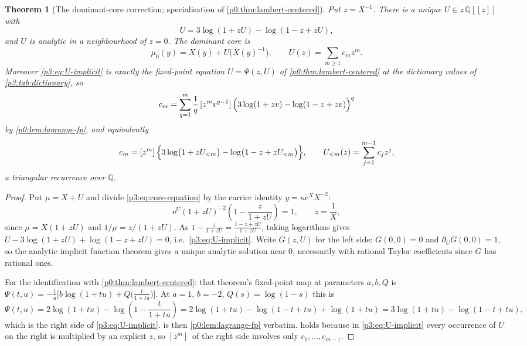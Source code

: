 \documentclass[11pt,a4paper,oneside]{book}
\theoremstyle{plain}
\newtheorem{theorem}{Theorem}[chapter]
\theoremstyle{definition}
\theoremstyle{remark}
\newcommand{\Rat}{\mathbb{Q}}
\newcommand{\e}{\mathrm{e}}
\newcommand{\Coef}[1]{[#1]\,}
\begin{document}
\begin{theorem}[The dominant-core correction; specialisation of
\cref{p0:thm:lambert-centered}]\label{p3:thm:core-correction} Put $z=X^{-1}$. There is a unique
$U\in z\,\Rat[[z]]$ with
\begin{equation}\label{p3:eq:U-implicit}
 U=3\log(1+zU)-\log(1-z+zU),
\end{equation}
and $U$ is analytic in a neighbourhood of $z=0$. The dominant core is
\begin{equation}\label{p3:eq:core}
 \mu_{0}(y)=X(y)+U\bigl(X(y)^{-1}\bigr),\qquad U(z)=\sum_{m\ge1}c_{m}z^{m}.
\end{equation}
Moreover \cref{p3:eq:U-implicit} is exactly the fixed-point equation $U=\Psi(z,U)$ of
\cref{p0:thm:lambert-centered} at the dictionary values of \cref{p3:tab:dictionary}, so
\begin{equation}\label{p3:eq:c-lagrange}
 c_{m}=\sum_{q=1}^{m}\frac1q\,
 \Coef{z^{m}v^{q-1}}\Bigl(3\log(1+zv)-\log(1-z+zv)\Bigr)^{q}
\end{equation}
by \cref{p0:lem:lagrange-fp}, and equivalently
\begin{equation}\label{p3:eq:c-recurrence-core}
 c_{m}=\Coef{z^{m}}\Bigl\{3\log\bigl(1+zU_{<m}\bigr)
 -\log\bigl(1-z+zU_{<m}\bigr)\Bigr\},
 \qquad U_{<m}(z)=\sum_{j=1}^{m-1}c_{j}z^{j},
\end{equation}
a triangular recurrence over $\Rat$.
\end{theorem}

\begin{proof}
Put $\mu=X+U$ and divide \cref{p3:eq:core-equation} by the carrier identity
$y=\kappa\e^{X}X^{-2}$:
\[
\e^{U}(1+zU)^{-2}\left(1-\frac{z}{1+zU}\right)=1, \qquad z=\frac1X ,
\]
since $\mu=X(1+zU)$ and $1/\mu=z/(1+zU)$. As $1-\frac{z}{1+zU}=\frac{1-z+zU}{1+zU}$, taking
logarithms gives $U-3\log(1+zU)+\log(1-z+zU)=0$, i.e.\ \cref{p3:eq:U-implicit}. Write $G(z,U)$ for
the left side: $G(0,0)=0$ and $\partial_{U}G(0,0)=1$, so the analytic implicit function theorem
gives a unique analytic solution near $0$, necessarily with rational Taylor coefficients since $G$
has rational ones.

For the identification with \cref{p0:thm:lambert-centered}: that theorem's fixed-point map at
parameters $a,b,Q$ is $\Psi(t,u)=-\frac1a\bigl[b\log(1+tu)+Q\bigl(\tfrac{t}{1+tu}\bigr)\bigr]$. At
$a=1$, $b=-2$, $Q(s)=\log(1-s)$ this is
\[
\Psi(t,u)=2\log(1+tu)-\log\!\left(1-\frac{t}{1+tu}\right) =2\log(1+tu)-\log(1-t+tu)+\log(1+tu)
=3\log(1+tu)-\log(1-t+tu),
\]
which is the right side of \cref{p3:eq:U-implicit}.  is then
\cref{p0:lem:lagrange-fp} verbatim.  holds because in
\cref{p3:eq:U-implicit} every occurrence of $U$ on the right is multiplied by an explicit $z$, so
$\Coef{z^{m}}$ of the right side involves only $c_{1},\dots,c_{m-1}$.
\end{proof}
\end{document}
